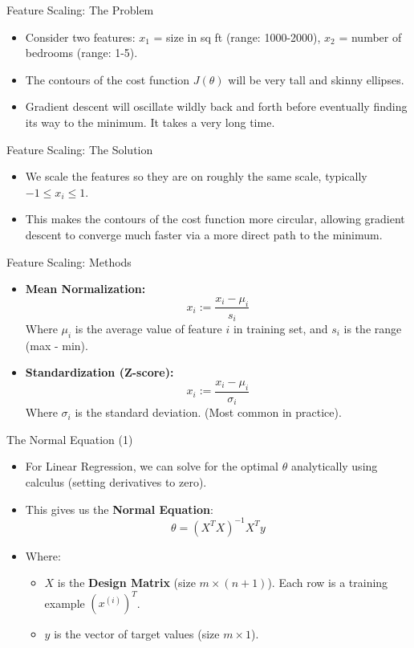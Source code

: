 \documentclass[aspectratio=169]{beamer}
\begin{document}
\begin{frame}{Feature Scaling: The Problem}
\begin{itemize}
    \item Consider two features: $x_1$ = size in sq ft (range: 1000-2000), $x_2$ = number of bedrooms (range: 1-5).
    \item The contours of the cost function $J(\theta)$ will be very tall and skinny ellipses.
    \item Gradient descent will oscillate wildly back and forth before eventually finding its way to the minimum. It takes a very long time.
\end{itemize}
\end{frame}

\begin{frame}{Feature Scaling: The Solution}
\begin{itemize}
    \item We scale the features so they are on roughly the same scale, typically $-1 \le x_i \le 1$.
    \item This makes the contours of the cost function more circular, allowing gradient descent to converge much faster via a more direct path to the minimum.
\end{itemize}
\end{frame}

\begin{frame}{Feature Scaling: Methods}
\begin{itemize}
    \item \textbf{Mean Normalization:}
    $$ x_i := \frac{x_i - \mu_i}{s_i} $$
    Where $\mu_i$ is the average value of feature $i$ in training set, and $s_i$ is the range (max - min).
    \item \textbf{Standardization (Z-score):}
    $$ x_i := \frac{x_i - \mu_i}{\sigma_i} $$
    Where $\sigma_i$ is the standard deviation. (Most common in practice).
\end{itemize}
\end{frame}

\begin{frame}{The Normal Equation (1)}
\begin{itemize}
    \item For Linear Regression, we can solve for the optimal $\theta$ analytically using calculus (setting derivatives to zero).
    \item This gives us the \textbf{Normal Equation}:
    $$ \theta = (X^T X)^{-1} X^T y $$
    \item Where:
    \begin{itemize}
        \item $X$ is the \textbf{Design Matrix} (size $m \times (n+1)$). Each row is a training example $(x^{(i)})^T$.
        \item $y$ is the vector of target values (size $m \times 1$).
    \end{itemize}
\end{itemize}
\end{frame}
\end{document}
